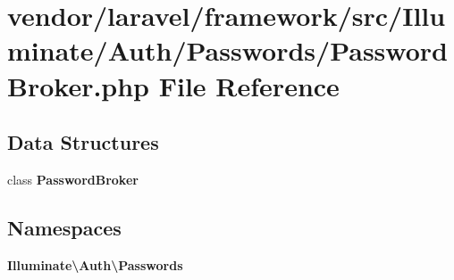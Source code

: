 \section{vendor/laravel/framework/src/\+Illuminate/\+Auth/\+Passwords/\+Password\+Broker.php File Reference}
\label{_auth_2_passwords_2_password_broker_8php}
\subsection*{Data Structures}
\begin{DoxyCompactItemize}
\item 
class {\bf Password\+Broker}
\end{DoxyCompactItemize}
\subsection*{Namespaces}
\begin{DoxyCompactItemize}
\item 
 {\bf Illuminate\textbackslash{}\+Auth\textbackslash{}\+Passwords}
\end{DoxyCompactItemize}
